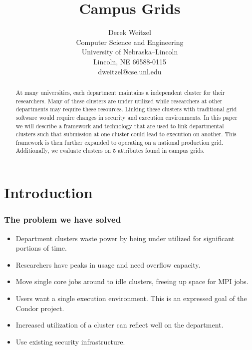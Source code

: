 \documentclass[11pt]{article}
\title{\bf Campus Grids}
\author{Derek Weitzel\\
Computer Science and Engineering\\
University of Nebraska--Lincoln\\
Lincoln, NE 66588-0115\\
dweitzel@cse.unl.edu
       }
\begin{document}
\maketitle

\begin{abstract}

At many universities, each department maintains a independent cluster for their researchers.  Many of these clusters are under utilized while researchers at other departments may require these resources.  Linking these clusters with traditional grid software would require changes in security and execution environments.  In this paper we will describe a framework and technology that are used to link departmental clusters such that submission at one cluster could lead to execution on another.  This framework is then further expanded to operating on a national production grid.  Additionally, we evaluate clusters on 5 attributes found in campus grids.


\end{abstract}

\newpage
\tableofcontents
\newpage


\section{Introduction}
\label{sec:Introduction}

\subsubsection* {The problem we have solved}

\begin{itemize}

\item Department clusters waste power by being under utilized for significant portions of time.
\item Researchers have peaks in usage and need overflow capacity.
\item Move single core jobs around to idle clusters, freeing up space for MPI jobs.
\item Users want a single execution environment.  This is an expressed goal of the Condor project.
\item Increased utilization of a cluster can reflect well on the department.
\item Use existing security infrastructure.


\end{itemize}
\end{document}
